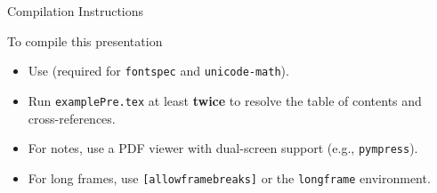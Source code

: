 \documentclass[aspectratio=43]{beamer}
\begin{document}
\makethankyoupage[takeaway={Hope \texttt{myPresentation} Beamer Theme and the guide to layout help you with making professional slides!}]

\begin{frame}{Compilation Instructions}
    \begin{exampleblock}{To compile this presentation}
        \begin{itemize}
            \item Use \LuaLaTeX (required for \texttt{fontspec} and \texttt{unicode-math}).
            \item Run \LuaLaTeX \texttt{examplePre.tex} at least \textbf{twice} to resolve the table of contents and cross-references.
            \item For notes, use a PDF viewer with dual-screen support (e.g., \texttt{pympress}).
            \item For long frames, use \texttt{[allowframebreaks]} or the \texttt{longframe} environment.
        \end{itemize}
    \end{exampleblock}
\end{frame}

\end{document}
